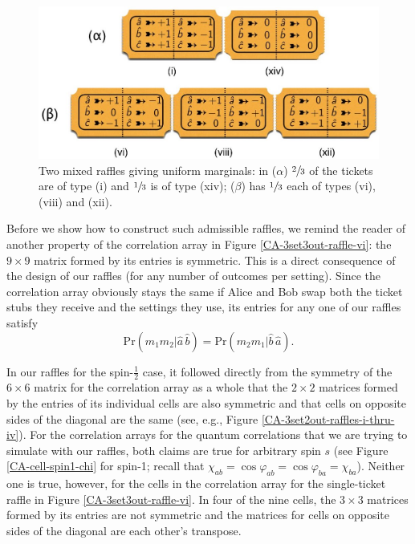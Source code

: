 \begin{figure}[h]
 \centering
   \includegraphics[width=5in]{admissible-raffles-spin1.jpeg} 
   \caption{Two mixed raffles giving uniform marginals: in ($\alpha$) $\sfrac23$ of the tickets are of type (i) and $\sfrac13$ is of type (xiv); ($\beta$) has $\sfrac13$ each of types (vi), (viii) and (xii).}
   \label{admissible-raffles-spin1}
\end{figure}

Before we show how to construct such admissible raffles, we remind the reader of another property of the correlation array in Figure \ref{CA-3set3out-raffle-vi}: the $9 \times 9$ matrix formed by its entries is symmetric. This is a direct consequence of the design of our raffles (for any number of outcomes per setting). Since the correlation array obviously stays the same if Alice and Bob swap both the ticket stubs they receive and the settings they use, its entries for any one of our raffles satisfy  
\begin{equation}
\mathrm{Pr}\!\left(m_1 m_2 \big| \hat{a} \,\hat{b}\right)
=  \mathrm{Pr}\!\left(m_2 m_1 \big| \hat{b} \,\hat{a}\right).
\label{swap symmetry}
\end{equation}

In our raffles for the spin-$\frac12$ case, it followed directly from the symmetry of the $6 \times 6$ matrix for the correlation array as a whole that the $2 \times 2$ matrices formed by the entries of its individual cells are also symmetric and that cells on opposite sides of the diagonal are the same (see, e.g., Figure \ref{CA-3set2out-raffles-i-thru-iv}). For the correlation arrays for the quantum correlations that we are trying to simulate with our raffles, both claims are true for arbitrary spin $s$ (see Figure \ref{CA-cell-spin1-chi} for spin-1; recall that $\chi_{ab} = \cos{\varphi_{ab}} = \cos{\varphi_{ba}} = \chi_{ba}$). Neither one is true, however, for the cells in the correlation array for the single-ticket raffle in Figure \ref{CA-3set3out-raffle-vi}.  In four of the nine cells, the $3 \times 3$ matrices formed by its entries are not symmetric and the matrices for cells on opposite sides of the diagonal are each other's transpose. 

